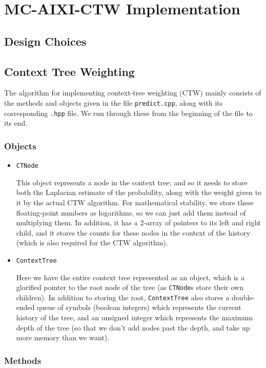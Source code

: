 \documentclass[pdftex,twoside,a4paper]{report}
\begin{document}
\chapter{MC-AIXI-CTW Implementation}
\section{Design Choices}
\section{Context Tree Weighting}
The algorithm for implementing context-tree weighting (CTW) mainly consists of the methods and objects given in the file \texttt{predict.cpp}, along with its corresponding \texttt{.hpp} file. We run through these from the beginning of the file to its end.  

\subsection{Objects}
\begin{itemize}
\item{\texttt{CTNode}

This object represents a node in the context tree; and so it needs to store both the Laplacian estimate of the probability, along with the weight given to it by the actual CTW algorithm. For mathematical stability, we store these floating-point numbers as logarithms, so we can just add them instead of multiplying them. In addition, it has a 2-array of pointers to its left and right child, and it stores the counts for these nodes in the context of the history (which is also required for the CTW algorithm).
  }
\item{\texttt{ContextTree}

Here we have the entire context tree represented as an object, which is a glorified pointer to the root node of the tree (as \texttt{CTNode}s store their own children). In addition to storing the root, \texttt{ContextTree} also stores a double-ended queue of symbols (boolean integers) which represents the current history of the tree, and an unsigned integer which represents the maximum depth of the tree (so that we don't add nodes past the depth, and take up more memory than we want).
  }
\end{itemize}

\subsection{Methods}
\end{document}
